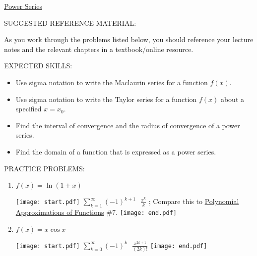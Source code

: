\documentclass[12pt]{article}
\begin{document}
\begin{center}
\underline{\LARGE{Power Series}}
\end{center}

\noindent SUGGESTED REFERENCE MATERIAL:

\medskip

\noindent As you work through the problems listed below, you should reference your lecture notes and the relevant chapters in a textbook/online resource.

\medskip

\noindent EXPECTED SKILLS:

\medskip

\begin{itemize}[topsep=0pt]

\item Use sigma notation to write the Maclaurin series for a function $f(x)$.

\item Use sigma notation to write the Taylor series for a function $f(x)$ about a specified $x=x_0$.

\item Find the interval of convergence and the radius of convergence of a power series.

\item Find the domain of a function that is expressed as a power series.

\end{itemize}

\medskip

\noindent PRACTICE PROBLEMS:

\medskip


\begin{enumerate}

\item $f(x)=\ln(1+x)$

\texttt{[image: start.pdf]}
{{$\sum_{k=1}^{\infty}{(-1)^{k+1} \text{ } \frac{x^k}{k}}$ ; Compare this to \underline{Polynomial Approximations of Functions} \#7. }}
\texttt{[image: end.pdf]}


\item $f(x)=x\cos{x}$

\texttt{[image: start.pdf]}
{{$\sum_{k=0}^{\infty}{(-1)^{k} \text{ } \frac{x^{2k+1}}{(2k)!}}$}}
\texttt{[image: end.pdf]}


\end{enumerate}
\end{document}
